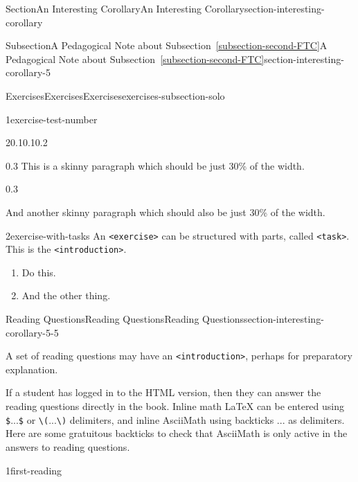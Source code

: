 \documentclass[twoside,10pt,]{article}
\newcommand{\xreffont}{\relax}
\newcommand{\mono}[1]{\texttt{#1}}
\numberwithin{equation}{section}
\begin{document}
\begin{sectionptx}{Section}{An Interesting Corollary}{}{An Interesting Corollary}{}{}{section-interesting-corollary}
\begin{subsectionptx}{Subsection}{A Pedagogical Note about Subsection~{\xreffont\ref*{subsection-second-FTC}}}{}{A Pedagogical Note about Subsection~{\xreffont\ref*{subsection-second-FTC}}}{}{}{section-interesting-corollary-5}
\begin{exercises-subsubsection}{Exercises}{Exercises}{}{Exercises}{}{}{exercises-subsection-solo}
\begin{divisionexercise}{1}{}{}{exercise-test-number}
\begin{sidebyside}{2}{0.1}{0.1}{0.2}
\begin{sbspanel}{0.3}
This is a skinny paragraph which should be just 30\% of the width.%
\end{sbspanel}%
\begin{sbspanel}{0.3}%
\par
And another skinny paragraph which should also be just 30\% of the width.%
\end{sbspanel}%
\end{sidebyside}%
\end{divisionexercise}%
\begin{divisionexercise}{2}{}{}{exercise-with-tasks}%
An \mono{<exercise>} can be structured with parts, called \mono{<task>}.  This is the \mono{<introduction>}.%
\begin{enumerate}[font=\bfseries,label=(\alph*),ref=\alph*]%
\item{}Do this.%
\item{}And the other thing.%
\end{enumerate}%
\end{divisionexercise}%
\end{exercises-subsubsection}
%
%
\typeout{************************************************}
\typeout{************************************************}
%
\begin{reading-questions-subsubsection}{Reading Questions}{Reading Questions}{}{Reading Questions}{}{}{section-interesting-corollary-5-5}
\begin{introduction}{}%
%
A set of reading questions may have an \mono{<introduction>}, perhaps for preparatory explanation.%
\par
If a student has logged in to the HTML version, then they can answer the reading questions directly in the book. Inline math LaTeX can be entered using \mono{\$}...\mono{\$} or \mono{\textbackslash{}(}...\mono{\textbackslash{})} delimiters, and inline AsciiMath using backticks \mono{\textasciigrave{}}...\mono{\textasciigrave{}} as delimiters. Here are some \textasciigrave{}gratuitous backticks\textasciigrave{} to check that AsciiMath is only active in the answers to reading questions.%
\end{introduction}%
\begin{divisionexercise}{1}{}{}{first-reading}%

\end{divisionexercise}
\end{reading-questions-subsubsection}
\end{subsectionptx}
\end{sectionptx}
\end{document}
